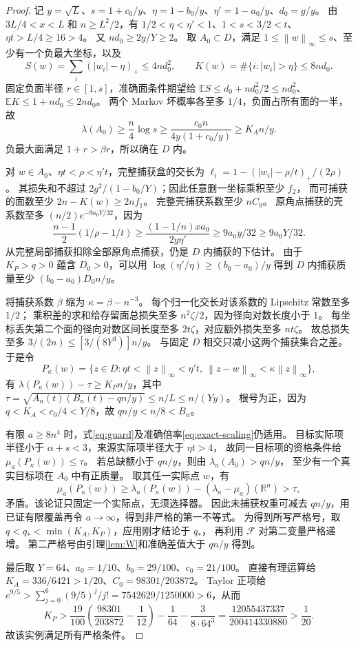 \documentclass[UTF8,a4paper,11pt,fontset=fandol]{ctexart}
\theoremstyle{remark}
\newcommand{\R}{\mathbb R}
\newcommand{\norm}[1]{\left\lVert#1\right\rVert}
\newcommand{\Fcal}{\mathcal F}
\begin{document}
\begin{proof}
记 $y=\sqrt L$、$s=1+c_0/y$、$\eta=1-b_0/y$、$\eta'=1-a_0/y$、$d_0=g/y$。
由 $3L/4<x<L$ 和 $n\ge L^2/2$，有
$1/2<\eta<\eta'<1$、$1<s<3/2<t$、$\eta t>L/4\ge16>4$。
又 $nd_0\ge2y/Y\ge2$。
取 $A_0\subset D$，满足 $1\le\norm w_\infty\le s$、至少有一个负最大坐标，以及
\[
 S(w)=\sum_i(|w_i|-\eta)_+\le4nd_0^2,\qquad
 K(w)=\#\{i:|w_i|>\eta\}\le8nd_0.
\]
固定负面半径 $r\in[1,s]$，准确面条件期望给
$\mathbb ES\le d_0+nd_0^2/2\le nd_0^2$、
$\mathbb EK\le1+nd_0\le2nd_0$。
两个 Markov 坏概率各至多 $1/4$，负面占所有面的一半，故
\[
 \lambda(A_0)\ge\frac n4\log s
 \ge\frac{c_0n}{4y(1+c_0/y)}\ge K_A n/y.
\]
负最大面满足 $1+r>\beta r$，所以确在 $D$ 内。

对 $w\in A_0$、$\eta t<\rho<\eta't$，完整捕获盒的交长为
$\ell_i=1-(|w_i|-\rho/t)_+/(2\rho)$。
其损失和不超过 $2g^2/(1-b_0/Y)$；因此任意删一坐标乘积至少 $f_2$，
而可捕获的面数至少 $2n-K(w)\ge2nf_1$。
完整壳捕获系数至少 $nC_0$。
原角点捕获的壳系数至多 $(n/2)e^{-9a_0Y/32}$，因为
\[
 \frac{n-1}{2}(1/\rho-1/t)
 \ge\frac{(1-1/n)xa_0}{2y\eta'}\ge9a_0y/32\ge9a_0Y/32.
\]
从完整局部捕获扣除全部原角点捕获，仍是 $D$ 内捕获的下估计。
由于 $K_P>q>0$ 蕴含 $D_0>0$，可以用
$\log(\eta'/\eta)\ge(b_0-a_0)/y$ 得到 $D$ 内捕获质量至少
$(b_0-a_0)D_0n/y$。

将捕获系数 $\beta$ 缩为 $\kappa=\beta-n^{-3}$。
每个归一化交长对该系数的 Lipschitz 常数至多 $1/2$；
乘积差的求和给存留面总损失至多 $n^2\zeta/2$，因为径向对数长度小于 $1$。
每坐标丢失第二个面的径向对数区间长度至多 $2t\zeta$，对应额外损失至多 $nt\zeta$。
故总损失至多 $3/(2n)\le[3/(8Y^3)]n/y$。
与固定 $D$ 相交只减小这两个捕获集合之差。
于是令
\[
 P_\kappa(w)=\{z\in D:\eta t<\norm z_\infty<\eta't,
                   \ \norm{z-w}_\infty<\kappa\norm z_\infty\},
\]
有 $\lambda(P_\kappa(w))-\tau\ge K_Pn/y$，其中
$\tau=\sqrt{A_n(t)(B_n(t)-qn/y)}\le n/L\le n/(Yy)$。
根号为正，因为 $q<K_A<c_0/4<Y/8$，故 $qn/y<n/8<B_n$。

有限 $a\ge8n^4$ 时，式\eqref{eq:guard}及准确倍率\eqref{eq:exact-scaling}仍适用。
目标实际项半径小于 $\alpha+s<3$，来源实际项半径大于 $\eta t>4$，
故同一目标项的资格条件给 $\mu_a(P_\kappa(w))\le\tau$。
若总缺额小于 $qn/y$，则由 $\lambda_a(A_0)>qn/y$，
至少有一个真实目标项在 $A_0$ 中有正质量。
取其任一实际点 $w$，有
\[
 \mu_a(P_\kappa(w))\ge\lambda_a(P_\kappa(w))-(\lambda_a-\mu_a)(\R^n)>\tau,
\]
矛盾。该论证只固定一个实际点，无须选择器。
因此未捕获权重可减去 $qn/y$，用已证有限覆盖再令 $a\to\infty$，得到非严格的第一不等式。
为得到所写严格号，取 $q<q_*<\min(K_A,K_P)$，应用刚才结论于 $q_*$，
再利用 $\Fcal$ 对第二变量严格递增。
第二严格号由引理\ref{lem:W}和准确差值大于 $qn/y$ 得到。

最后取 $Y=64$、$a_0=1/10$、$b_0=29/100$、$c_0=21/100$。
直接有理运算给 $K_A=336/6421>1/20$、$C_0=98301/203872$。
Taylor 正项给
$e^{9/5}>\sum_{j=0}^6(9/5)^j/j!=7542629/1250000>6$，从而
\[
 K_P>\frac{19}{100}\left(\frac{98301}{203872}-\frac1{12}\right)
       -\frac1{64}-\frac3{8\cdot64^3}
 =\frac{12055437337}{200414330880}>\frac1{20}.
\]
故该实例满足所有严格条件。
\end{proof}
\end{document}
